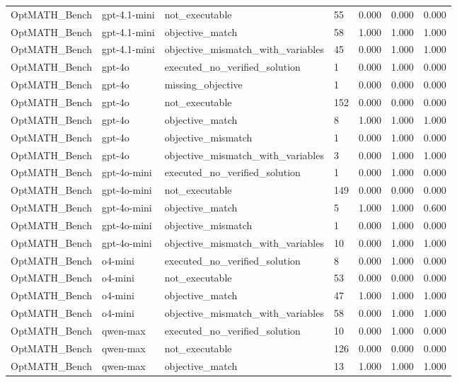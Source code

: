 \begin{table}[t]
\begin{tabular}{lllllll}
OptMATH\_Bench & gpt-4.1-mini & not\_executable & 55 & 0.000 & 0.000 & 0.000 \\
OptMATH\_Bench & gpt-4.1-mini & objective\_match & 58 & 1.000 & 1.000 & 1.000 \\
OptMATH\_Bench & gpt-4.1-mini & objective\_mismatch\_with\_variables & 45 & 0.000 & 1.000 & 1.000 \\
OptMATH\_Bench & gpt-4o & executed\_no\_verified\_solution & 1 & 0.000 & 1.000 & 0.000 \\
OptMATH\_Bench & gpt-4o & missing\_objective & 1 & 0.000 & 0.000 & 0.000 \\
OptMATH\_Bench & gpt-4o & not\_executable & 152 & 0.000 & 0.000 & 0.000 \\
OptMATH\_Bench & gpt-4o & objective\_match & 8 & 1.000 & 1.000 & 1.000 \\
OptMATH\_Bench & gpt-4o & objective\_mismatch & 1 & 0.000 & 1.000 & 0.000 \\
OptMATH\_Bench & gpt-4o & objective\_mismatch\_with\_variables & 3 & 0.000 & 1.000 & 1.000 \\
OptMATH\_Bench & gpt-4o-mini & executed\_no\_verified\_solution & 1 & 0.000 & 1.000 & 0.000 \\
OptMATH\_Bench & gpt-4o-mini & not\_executable & 149 & 0.000 & 0.000 & 0.000 \\
OptMATH\_Bench & gpt-4o-mini & objective\_match & 5 & 1.000 & 1.000 & 0.600 \\
OptMATH\_Bench & gpt-4o-mini & objective\_mismatch & 1 & 0.000 & 1.000 & 0.000 \\
OptMATH\_Bench & gpt-4o-mini & objective\_mismatch\_with\_variables & 10 & 0.000 & 1.000 & 1.000 \\
OptMATH\_Bench & o4-mini & executed\_no\_verified\_solution & 8 & 0.000 & 1.000 & 0.000 \\
OptMATH\_Bench & o4-mini & not\_executable & 53 & 0.000 & 0.000 & 0.000 \\
OptMATH\_Bench & o4-mini & objective\_match & 47 & 1.000 & 1.000 & 1.000 \\
OptMATH\_Bench & o4-mini & objective\_mismatch\_with\_variables & 58 & 0.000 & 1.000 & 1.000 \\
OptMATH\_Bench & qwen-max & executed\_no\_verified\_solution & 10 & 0.000 & 1.000 & 0.000 \\
OptMATH\_Bench & qwen-max & not\_executable & 126 & 0.000 & 0.000 & 0.000 \\
OptMATH\_Bench & qwen-max & objective\_match & 13 & 1.000 & 1.000 & 1.000 \\

\end{tabular}
\end{table}
